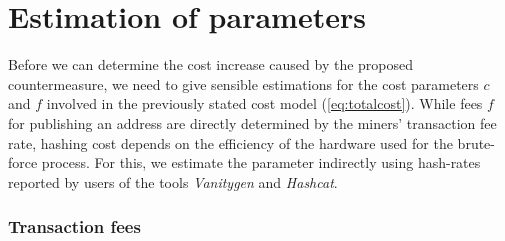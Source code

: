 \documentclass[a4paper,11pt,titlepage]{scrbook}
\begin{document}
\section{Estimation of parameters}



Before we can determine the cost increase caused by the proposed countermeasure, we need to give sensible estimations for the cost parameters $c$ and $f$ involved in the previously stated cost model (\ref{eq:totalcost}).
While fees $f$ for publishing an address are directly determined by the miners' transaction fee rate, hashing cost depends on the efficiency of the hardware used for the brute-force process.
For this, we estimate the parameter indirectly using hash-rates reported by users of the tools \emph{Vanitygen} and \emph{Hashcat}.

\subsubsection*{Transaction fees}
\end{document}
